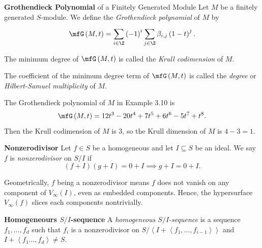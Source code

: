 \documentclass[co439]{subfiles}
\begin{document}
    \rruleline
    
    \begin{definition}{\textbf{Grothendieck Polynomial} of a Finitely Generated Module}
        Let $M$ be a finitely generated $S$-module. We define the \emph{Grothendieck polynomial} of $M$ by
        \begin{equation*}
            \mfG\left( M,t \right) = \sum^{}_{i\in\Z}\left( -1 \right)^i\sum^{}_{j\in\Z}\beta_{i,j}\left( 1-t \right)^j.
        \end{equation*}

        The minimum degree of $\mfG\left( M,t \right)$ is called the \emph{Krull codimension} of $M$.

        The coefficient of the minimum degree term of $\mfG\left( M,t \right)$ is called the \emph{degree} or \emph{Hilbert-Samuel multiplicity} of $M$.
    \end{definition}

    \begin{example}{}
        The Grothendieck polynomial of $M$ in Example 3.10 is
        \begin{equation*}
            \mfG\left( M,t \right) = 12t^{3}-20t^4+7t^5+6t^6-5t^7+t^8.
        \end{equation*}
        Then the Krull codimension of $M$ is $3$, so the Krull dimension of $M$ is $4-3=1$.
    \end{example}
    
    \rruleline
    
    \begin{definition}{\textbf{Nonzerodivisor}}
        Let $f\in S$ be a homogeneous and let $I\subseteq S$ be an ideal. We say $f$ is \emph{nonzerodivisor} on $S /I$ if
        \begin{equation*}
            \left( f+I \right)\left( g+I \right) = 0+I \implies g+I=0+I.
        \end{equation*}
    \end{definition}

    \np Geometrically, $f$ being a nonzerodivisor means $f$ does not vanish on any component of $V_{\infty}\left( I \right)$, even as embedded components. Hence, the hypersurface $V_{\infty}\left( f \right)$ slices each components nontrivially.

    \begin{definition}{\textbf{Homogeneours $S /I$-sequence}}
        A \emph{homogeneous $S /I$-sequence} is a sequence $f_1,\ldots,f_d$ such that $f_i$ is a nonzerodivisor on $S /\left< I+\left< f_1,\ldots,f_{i-1} \right>  \right> $ and $I+\left< f_1\ldots,f_d \right>\neq S$.
    \end{definition}
\end{document}
